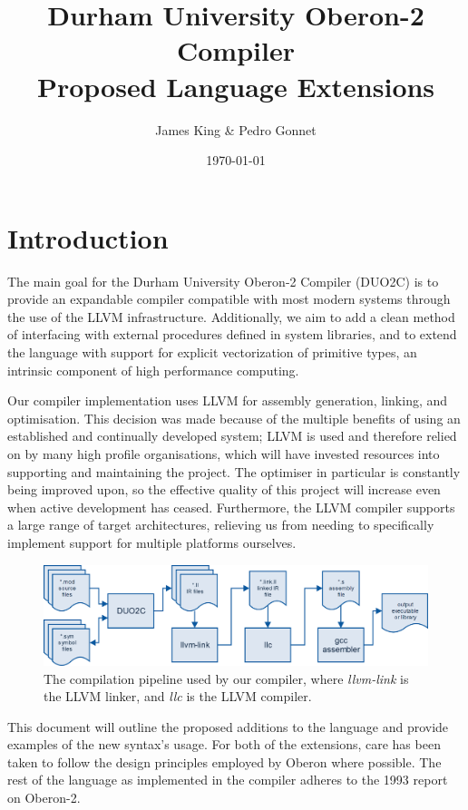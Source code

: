 \documentclass[a4paper,11pt]{article}
\title{\centering Durham University Oberon-2 Compiler \\ Proposed Language Extensions}
\date{\today}
\author{James King \& Pedro Gonnet}
\begin{document}
    \maketitle

    \section{Introduction}
    The main goal for the Durham University Oberon-2 Compiler (DUO2C) is to provide an expandable compiler compatible with most modern systems through the use of the LLVM infrastructure. Additionally, we aim to add a clean method of interfacing with external procedures defined in system libraries, and to extend the language with support for explicit vectorization of primitive types, an intrinsic component of high performance computing.

    Our compiler implementation uses LLVM for assembly generation, linking, and optimisation. This decision was made because of the multiple benefits of using an established and continually developed system; LLVM is used and therefore relied on by many high profile organisations\cite{llvmusers}, which will have invested resources into supporting and maintaining the project. The optimiser in particular is constantly being improved upon, so the effective quality of this project will increase even when active development has ceased. Furthermore, the LLVM compiler supports a large range of target architectures, relieving us from needing to specifically implement support for multiple platforms ourselves.

    \begin{figure}[!htbp]
    \centering
    \includegraphics[width=\textwidth]{compiler}
    \caption{The compilation pipeline used by our compiler, where \emph{llvm-link} is the LLVM linker, and \emph{llc} is the LLVM compiler.}
    \end{figure}

    This document will outline the proposed additions to the language and provide examples of the new syntax's usage. For both of the extensions, care has been taken to follow the design principles employed by Oberon where possible. The rest of the language as implemented in the compiler adheres to the 1993 report on Oberon-2\cite{oberspec}.
\end{document}
